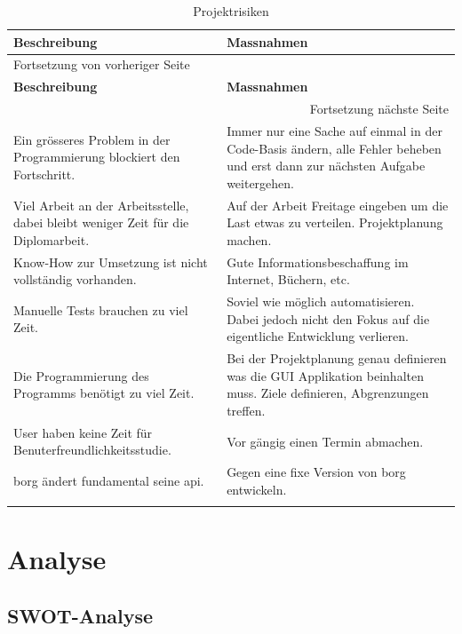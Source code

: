 \begin{longtable}{|p{}|p{}|}
\hline
\textbf{Beschreibung}\cellcolor[HTML]{C0C0C0} & \textbf{Massnahmen}\cellcolor[HTML]{C0C0C0}\\
\hline
\endfirsthead
\multicolumn{2}{l}{Fortsetzung von vorheriger Seite} \\
\hline

\textbf{Beschreibung}\cellcolor[HTML]{C0C0C0} & \textbf{Massnahmen}\cellcolor[HTML]{C0C0C0} \\

\hline
\endhead
\hline\multicolumn{2}{r}{Fortsetzung nächste Seite} \\
\endfoot
\endlastfoot
\hline
Ein grösseres Problem in der Programmierung blockiert den Fortschritt. & Immer nur eine Sache auf einmal in der Code-Basis ändern, alle Fehler beheben und erst dann zur nächsten Aufgabe weitergehen.\\
\hline
Viel Arbeit an der Arbeitsstelle, dabei bleibt weniger Zeit für die Diplomarbeit. & Auf der Arbeit Freitage eingeben um die Last etwas zu verteilen. Projektplanung machen.\\
\hline
Know-How zur Umsetzung ist nicht vollständig vorhanden. & Gute Informationsbeschaffung im Internet, Büchern, etc.\\
\hline
Manuelle Tests brauchen zu viel Zeit. & Soviel wie möglich automatisieren. Dabei jedoch nicht den Fokus auf die eigentliche Entwicklung verlieren.\\
\hline
Die Programmierung des Programms benötigt zu viel Zeit. & Bei der Projektplanung genau definieren was die GUI Applikation beinhalten muss. Ziele definieren, Abgrenzungen treffen.\\
\hline
User haben keine Zeit für Benuterfreundlichkeitsstudie. & Vor gängig einen Termin abmachen.\\
\hline
\gls{borg} ändert fundamental seine \gls{api}. & Gegen eine fixe Version von \gls{borg} entwickeln.\\
\hline
\caption{\label{tab:orge8eb370}
Projektrisiken}
\\
\end{longtable}

\section{Analyse}
\label{sec:org61eed6c}
\subsection{SWOT-Analyse}
\label{sec:orgd8cfd66}

